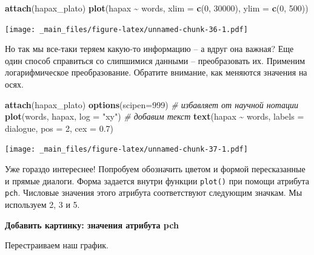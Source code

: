 \documentclass[
]{book}
\newenvironment{Shaded}{\begin{snugshade}}{\end{snugshade}}
\newcommand{\AttributeTok}[1]{\textcolor[rgb]{0.13,0.29,0.53}{#1}}
\newcommand{\CommentTok}[1]{\textcolor[rgb]{0.56,0.35,0.01}{\textit{#1}}}
\newcommand{\DecValTok}[1]{\textcolor[rgb]{0.00,0.00,0.81}{#1}}
\newcommand{\FloatTok}[1]{\textcolor[rgb]{0.00,0.00,0.81}{#1}}
\newcommand{\FunctionTok}[1]{\textcolor[rgb]{0.13,0.29,0.53}{\textbf{#1}}}
\newcommand{\NormalTok}[1]{#1}
\newcommand{\SpecialCharTok}[1]{\textcolor[rgb]{0.81,0.36,0.00}{\textbf{#1}}}
\newcommand{\StringTok}[1]{\textcolor[rgb]{0.31,0.60,0.02}{#1}}
\theoremstyle{definition}
\theoremstyle{definition}
\theoremstyle{definition}
\theoremstyle{definition}
\theoremstyle{remark}
\begin{document}
\begin{Shaded}
\begin{Highlighting}[]
\FunctionTok{attach}\NormalTok{(hapax\_plato) }
\FunctionTok{plot}\NormalTok{(hapax }\SpecialCharTok{\textasciitilde{}}\NormalTok{ words, }\AttributeTok{xlim =} \FunctionTok{c}\NormalTok{(}\DecValTok{0}\NormalTok{, }\DecValTok{30000}\NormalTok{), }\AttributeTok{ylim =} \FunctionTok{c}\NormalTok{(}\DecValTok{0}\NormalTok{, }\DecValTok{500}\NormalTok{))  }
\end{Highlighting}
\end{Shaded}

\texttt{[image: \_main\_files/figure-latex/unnamed-chunk-36-1.pdf]}

Но так мы все-таки теряем какую-то информацию -- а вдруг она важная? Еще один способ справиться со слипшимися данными -- преобразовать их. Применим логарифмическое преобразование. Обратите внимание, как меняются значения на осях.

\begin{Shaded}
\begin{Highlighting}[]
\FunctionTok{attach}\NormalTok{(hapax\_plato)}
\FunctionTok{options}\NormalTok{(}\AttributeTok{scipen=}\DecValTok{999}\NormalTok{) }\CommentTok{\# избавляет от научной нотации}
\FunctionTok{plot}\NormalTok{(words, hapax, }\AttributeTok{log =} \StringTok{"xy"}\NormalTok{)  }
\CommentTok{\# добавим текст}
\FunctionTok{text}\NormalTok{(hapax }\SpecialCharTok{\textasciitilde{}}\NormalTok{ words, }\AttributeTok{labels =}\NormalTok{ dialogue, }\AttributeTok{pos =} \DecValTok{2}\NormalTok{, }\AttributeTok{cex =} \FloatTok{0.7}\NormalTok{)}
\end{Highlighting}
\end{Shaded}

\texttt{[image: \_main\_files/figure-latex/unnamed-chunk-37-1.pdf]}

Уже гораздо интереснее! Попробуем обозначить цветом и формой пересказанные и прямые диалоги. Форма задается внутри функции \texttt{plot()} при помощи атрибута \texttt{pch}. Числовые значения этого атрибута соответствуют следующим значкам. Мы используем 2, 3 и 5.

\textbf{Добавить картинку: значения атрибута pch}

Перестраиваем наш график.
\end{document}
